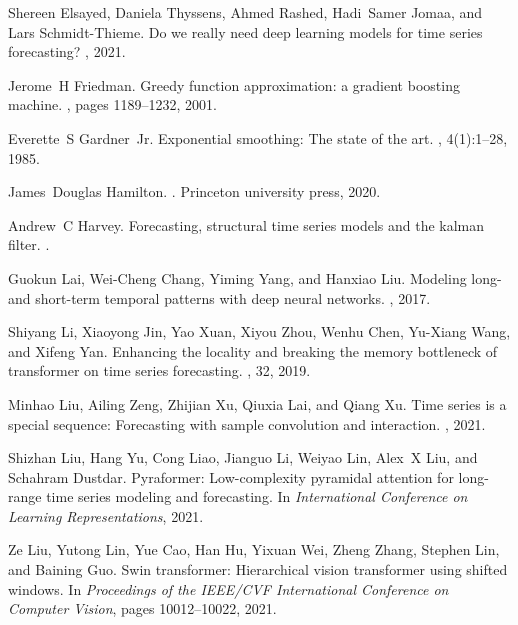 \documentclass[10pt,twocolumn,letterpaper]{article}
\begin{document}
\begin{thebibliography}{10}
Shereen Elsayed, Daniela Thyssens, Ahmed Rashed, Hadi~Samer Jomaa, and Lars
  Schmidt-Thieme.
\newblock Do we really need deep learning models for time series forecasting?
, 2021.

Jerome~H Friedman.
\newblock Greedy function approximation: a gradient boosting machine.
, pages 1189--1232, 2001.

Everette~S Gardner~Jr.
\newblock Exponential smoothing: The state of the art.
, 4(1):1--28, 1985.

James~Douglas Hamilton.
.
\newblock Princeton university press, 2020.

Andrew~C Harvey.
\newblock Forecasting, structural time series models and the kalman filter.
.

Guokun Lai, Wei-Cheng Chang, Yiming Yang, and Hanxiao Liu.
\newblock Modeling long- and short-term temporal patterns with deep neural
  networks.
, 2017.

Shiyang Li, Xiaoyong Jin, Yao Xuan, Xiyou Zhou, Wenhu Chen, Yu-Xiang Wang, and
  Xifeng Yan.
\newblock Enhancing the locality and breaking the memory bottleneck of
  transformer on time series forecasting.
, 32, 2019.

Minhao Liu, Ailing Zeng, Zhijian Xu, Qiuxia Lai, and Qiang Xu.
\newblock Time series is a special sequence: Forecasting with sample
  convolution and interaction.
, 2021.

Shizhan Liu, Hang Yu, Cong Liao, Jianguo Li, Weiyao Lin, Alex~X Liu, and
  Schahram Dustdar.
\newblock Pyraformer: Low-complexity pyramidal attention for long-range time
  series modeling and forecasting.
\newblock In {\em International Conference on Learning Representations}, 2021.

Ze Liu, Yutong Lin, Yue Cao, Han Hu, Yixuan Wei, Zheng Zhang, Stephen Lin, and
  Baining Guo.
\newblock Swin transformer: Hierarchical vision transformer using shifted
  windows.
\newblock In {\em Proceedings of the IEEE/CVF International Conference on
  Computer Vision}, pages 10012--10022, 2021.


\end{thebibliography}
\end{document}
